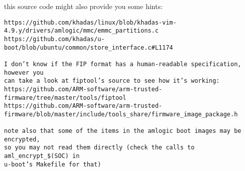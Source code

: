 this source code might also provide you some hints: 
\begin{verbatim}
https://github.com/khadas/linux/blob/khadas-vim-4.9.y/drivers/amlogic/mmc/emmc_partitions.c
https://github.com/khadas/u-boot/blob/ubuntu/common/store_interface.c#L1174

I don’t know if the FIP format has a human-readable specification, however you 
can take a look at fiptool’s source to see how it’s working: 
https://github.com/ARM-software/arm-trusted-firmware/tree/master/tools/fiptool 
https://github.com/ARM-software/arm-trusted-firmware/blob/master/include/tools_share/firmware_image_package.h

note also that some of the items in the amlogic boot images may be encrypted, 
so you may not read them directly (check the calls to aml_encrypt_$(SOC) in 
u-boot’s Makefile for that)
\end{verbatim}
